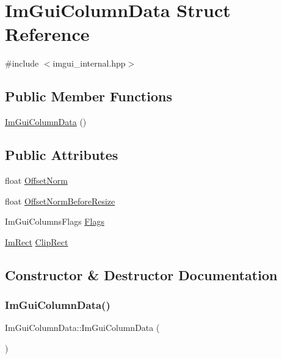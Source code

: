\hypertarget{struct_im_gui_column_data}{}\section{Im\+Gui\+Column\+Data Struct Reference}
\label{struct_im_gui_column_data}


{\ttfamily \#include $<$imgui\+\_\+internal.\+hpp$>$}

\subsection*{Public Member Functions}
\begin{DoxyCompactItemize}
\item 
\hyperlink{struct_im_gui_column_data_a296c9275c6e711dfd63ac0a3c1bb8c99}{Im\+Gui\+Column\+Data} ()
\end{DoxyCompactItemize}
\subsection*{Public Attributes}
\begin{DoxyCompactItemize}
\item 
float \hyperlink{struct_im_gui_column_data_a9678a00f55c9fa44ed35ec14ea9b697b}{Offset\+Norm}
\item 
float \hyperlink{struct_im_gui_column_data_aa97d00380db4a4b11ebc1f1f8ef72fc8}{Offset\+Norm\+Before\+Resize}
\item 
Im\+Gui\+Columns\+Flags \hyperlink{struct_im_gui_column_data_ab683ea097b8c60f143dc3c31818fa8d8}{Flags}
\item 
\hyperlink{struct_im_rect}{Im\+Rect} \hyperlink{struct_im_gui_column_data_aeccf8bbbd380fdd9d3350b5aac95ad34}{Clip\+Rect}
\end{DoxyCompactItemize}


\subsection{Constructor \& Destructor Documentation}
\hypertarget{struct_im_gui_column_data_a296c9275c6e711dfd63ac0a3c1bb8c99}{}\label{struct_im_gui_column_data_a296c9275c6e711dfd63ac0a3c1bb8c99} 
\subsubsection{\texorpdfstring{Im\+Gui\+Column\+Data()}{ImGuiColumnData()}}
{\footnotesize\ttfamily Im\+Gui\+Column\+Data\+::\+Im\+Gui\+Column\+Data (\begin{DoxyParamCaption}{ }\end{DoxyParamCaption})}



